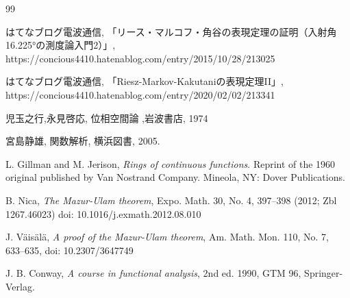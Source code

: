 \documentclass[leqno, a4paper, 12pt]{jsarticle}
\begin{document}

\begin{thebibliography}{99}


はてなブログ電波通信, 
「リース・マルコフ・角谷の表現定理の証明（入射角16.225°の測度論入門2）」, 
https://concious4410.hatenablog.com/entry/2015/10/28/213025

はてなブログ電波通信, 
「Riesz-Markov-Kakutaniの表現定理II」, 
https://concious4410.hatenablog.com/entry/2020/02/02/213341



児玉之行,永見啓応,
位相空間論
,岩波書店,
1974



宮島静雄, 
関数解析, 
横浜図書, 2005. 


L. Gillman and M. Jerison, 
\textit{Rings of continuous functions}. Reprint of the 1960 original published by Van Nostrand Company. Mineola, NY: Dover Publications. 


B. Nica, 
\textit{The Mazur-Ulam theorem}, 
Expo. Math. 30, No. 4, 397--398 (2012; Zbl 1267.46023)
 doi: 10.1016/j.exmath.2012.08.010

J. V\"{a}is\"{a}l\"{a}, 
\textit{A proof of the Mazur-Ulam theorem}, 
Am. Math. Mon. 110, No. 7, 633--635, 
doi: 10.2307/3647749

J. B. Conway, 
\textit{A course in functional analysis}, 
 2nd ed. 1990, GTM 96, Springer-Verlag. 


\end{thebibliography}
\end{document}
